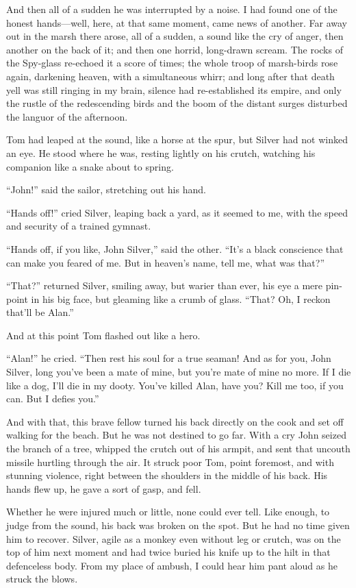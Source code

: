 And then all of a sudden he was interrupted by a noise. I had found one of the honest hands---well, here, at that same moment, came news of another. Far away out in the marsh there arose, all of a sudden, a sound like the cry of anger, then another on the back of it; and then one horrid, long-drawn scream. The rocks of the Spy-glass re-echoed it a score of times; the whole troop of marsh-birds rose again, darkening heaven, with a simultaneous whirr; and long after that death yell was still ringing in my brain, silence had re-established its empire, and only the rustle of the redescending birds and the boom of the distant surges disturbed the languor of the afternoon.

Tom had leaped at the sound, like a horse at the spur, but Silver had not winked an eye. He stood where he was, resting lightly on his crutch, watching his companion like a snake about to spring.

\enquote{John!} said the sailor, stretching out his hand.

\enquote{Hands off!} cried Silver, leaping back a yard, as it seemed to me, with the speed and security of a trained gymnast.

\enquote{Hands off, if you like, John Silver,} said the other. \enquote{It’s a black conscience that can make you feared of me. But in heaven’s name, tell me, what was that?}

\enquote{That?} returned Silver, smiling away, but warier than ever, his eye a mere pin-point in his big face, but gleaming like a crumb of glass. \enquote{That? Oh, I reckon that’ll be Alan.}

And at this point Tom flashed out like a hero.

\enquote{Alan!} he cried. \enquote{Then rest his soul for a true seaman! And as for you, John Silver, long you’ve been a mate of mine, but you’re mate of mine no more. If I die like a dog, I’ll die in my dooty. You’ve killed Alan, have you? Kill me too, if you can. But I defies you.}

And with that, this brave fellow turned his back directly on the cook and set off walking for the beach. But he was not destined to go far. With a cry John seized the branch of a tree, whipped the crutch out of his armpit, and sent that uncouth missile hurtling through the air. It struck poor Tom, point foremost, and with stunning violence, right between the shoulders in the middle of his back. His hands flew up, he gave a sort of gasp, and fell.

Whether he were injured much or little, none could ever tell. Like enough, to judge from the sound, his back was broken on the spot. But he had no time given him to recover. Silver, agile as a monkey even without leg or crutch, was on the top of him next moment and had twice buried his knife up to the hilt in that defenceless body. From my place of ambush, I could hear him pant aloud as he struck the blows.

